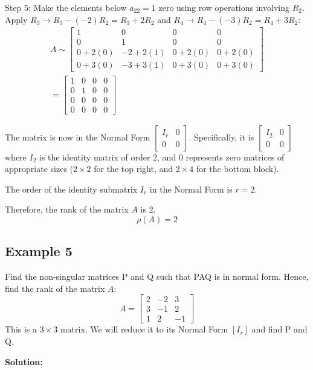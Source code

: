 \documentclass{article}
\begin{document}
Step 5: Make the elements below $a_{22}=1$ zero using row operations involving $R_2$.
Apply $R_3 \to R_3 - (-2)R_2 = R_3 + 2R_2$ and $R_4 \to R_4 - (-3)R_2 = R_4 + 3R_2$:
\begin{align*} A \sim \begin{bmatrix} 1 & 0 & 0 & 0 \\ 0 & 1 & 0 & 0 \\ 0 + 2(0) & -2 + 2(1) & 0 + 2(0) & 0 + 2(0) \\ 0 + 3(0) & -3 + 3(1) & 0 + 3(0) & 0 + 3(0) \end{bmatrix} \\ = \begin{bmatrix} 1 & 0 & 0 & 0 \\ 0 & 1 & 0 & 0 \\ 0 & 0 & 0 & 0 \\ 0 & 0 & 0 & 0 \end{bmatrix}\end{align*}

The matrix is now in the Normal Form $\begin{bmatrix} I_r & 0 \\ 0 & 0 \end{bmatrix}$. Specifically, it is $\begin{bmatrix} I_2 & 0 \\ 0 & 0 \end{bmatrix}$ where $I_2$ is the identity matrix of order 2, and 0 represents zero matrices of appropriate sizes ($2 \times 2$ for the top right, and $2 \times 4$ for the bottom block).

The order of the identity submatrix $I_r$ in the Normal Form is $r=2$.

Therefore, the rank of the matrix $A$ is 2.
\[ \rho(A) = 2 \]

\subsection{Example 5}
Find the non-singular matrices P and Q such that PAQ is in normal form. Hence, find the rank of the matrix $A$:
\[ A = \begin{bmatrix} 2 & -2 & 3 \\ 3 & -1 & 2 \\ 1 & 2 & -1 \end{bmatrix} \]
This is a $3 \times 3$ matrix. We will reduce it to its Normal Form $[I_r]$ and find P and Q.

\textbf{Solution:}
\end{document}
